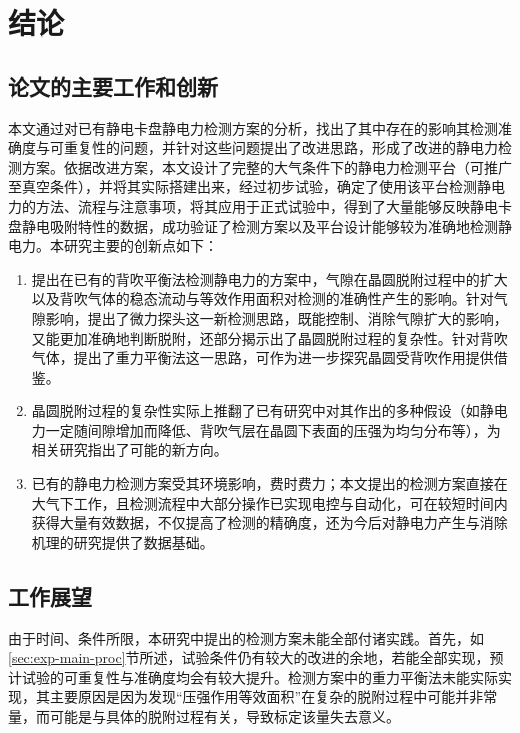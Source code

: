 \cleardoublepage
\chapter{结论}\label{ch:conclusion}


\section{论文的主要工作和创新}\label{sec:conclusion-review}

本文通过对已有静电卡盘静电力检测方案的分析，找出了其中存在的影响其检测准确度与可重复性的问题，并针对这些问题提出了改进思路，形成了改进的静电力检测方案。依据改进方案，本文设计了完整的大气条件下的静电力检测平台（可推广至真空条件），并将其实际搭建出来，经过初步试验，确定了使用该平台检测静电力的方法、流程与注意事项，将其应用于正式试验中，得到了大量能够反映静电卡盘静电吸附特性的数据，成功验证了检测方案以及平台设计能够较为准确地检测静电力。本研究主要的创新点如下：

\begin{enumerate}
  \item 提出在已有的背吹平衡法检测静电力的方案中，气隙在晶圆脱附过程中的扩大以及背吹气体的稳态流动与等效作用面积对检测的准确性产生的影响。针对气隙影响，提出了微力探头这一新检测思路，既能控制、消除气隙扩大的影响，又能更加准确地判断脱附，还部分揭示出了晶圆脱附过程的复杂性。针对背吹气体，提出了重力平衡法这一思路，可作为进一步探究晶圆受背吹作用提供借鉴。
  \item
  晶圆脱附过程的复杂性实际上推翻了已有研究中对其作出的多种假设（如静电力一定随间隙增加而降低、背吹气层在晶圆下表面的压强为均匀分布等），为相关研究指出了可能的新方向。
  \item 已有的静电力检测方案受其环境影响，费时费力；本文提出的检测方案直接在大气下工作，且检测流程中大部分操作已实现电控与自动化，可在较短时间内获得大量有效数据，不仅提高了检测的精确度，还为今后对静电力产生与消除机理的研究提供了数据基础。
\end{enumerate}


\section{工作展望}\label{sec:conclusion-future}

由于时间、条件所限，本研究中提出的检测方案未能全部付诸实践。首先，如\ref{sec:exp-main-proc}节所述，试验条件仍有较大的改进的余地，若能全部实现，预计试验的可重复性与准确度均会有较大提升。检测方案中的重力平衡法未能实际实现，其主要原因是因为发现“压强作用等效面积”在复杂的脱附过程中可能并非常量，而可能是与具体的脱附过程有关，导致标定该量失去意义。

